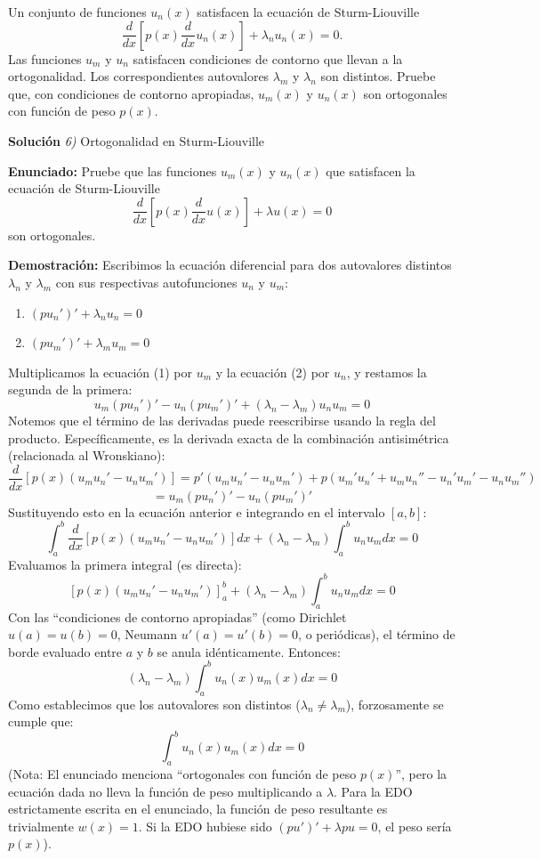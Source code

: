 \documentclass[11pt,spanish]{article}
\newcounter{problema}
\newcommand{\prob}{\stepcounter{problema} \vspace{.5cm} \noindent{\bf Problema \arabic{problema}: }}
\begin{document}
\prob Un conjunto de funciones $u_n(x)$ satisfacen la ecuación de Sturm-Liouville
\[
\frac{d}{dx}\left[p(x)\frac{d}{dx}u_n(x)\right] + \lambda_n u_n(x) = 0.
\]
Las funciones $u_m$ y $u_n$ satisfacen condiciones de contorno que llevan a la ortogonalidad. Los correspondientes autovalores $\lambda_m$ y $\lambda_n$ son distintos. Pruebe que, con condiciones de contorno apropiadas, $u_m(x)$ y $u_n(x)$ son ortogonales con función de peso $p(x)$.



\vspace{0.5cm}
{\bf Soluci\'on }{\em 6)}
Ortogonalidad en Sturm-Liouville
\vspace{0.5cm}

{\bf Enunciado:}
Pruebe que las funciones $u_m(x)$ y $u_n(x)$ que satisfacen la ecuación de Sturm-Liouville 
$$\frac{d}{dx}\left[p(x)\frac{d}{dx}u(x)\right] + \lambda u(x) = 0$$ 
son ortogonales.

{\bf Demostración:}
Escribimos la ecuación diferencial para dos autovalores distintos $\lambda_n$ y $\lambda_m$ con sus respectivas autofunciones $u_n$ y $u_m$:
\begin{enumerate}
\item $(p u_n')' + \lambda_n u_n = 0$
\item $(p u_m')' + \lambda_m u_m = 0$
\end{enumerate}
Multiplicamos la ecuación (1) por $u_m$ y la ecuación (2) por $u_n$, y restamos la segunda de la primera:
$$u_m(p u_n')' - u_n(p u_m')' + (\lambda_n - \lambda_m) u_n u_m = 0$$
Notemos que el término de las derivadas puede reescribirse usando la regla del producto. Específicamente, es la derivada exacta de la combinación antisimétrica (relacionada al Wronskiano):
$$\frac{d}{dx} \left[ p(x) (u_m u_n' - u_n u_m') \right] = p'(u_m u_n' - u_n u_m') + p(u_m' u_n' + u_m u_n'' - u_n' u_m' - u_n u_m'')$$
$$= u_m(p u_n')' - u_n(p u_m')'$$
Sustituyendo esto en la ecuación anterior e integrando en el intervalo $[a, b]$:
$$\int_a^b \frac{d}{dx} \left[ p(x) (u_m u_n' - u_n u_m') \right] dx + (\lambda_n - \lambda_m) \int_a^b u_n u_m dx = 0$$
Evaluamos la primera integral (es directa):
$$[ p(x) (u_m u_n' - u_n u_m') ]_a^b + (\lambda_n - \lambda_m) \int_a^b u_n u_m dx = 0$$
Con las ``condiciones de contorno apropiadas'' (como Dirichlet $u(a)=u(b)=0$, Neumann $u'(a)=u'(b)=0$, o periódicas), el término de borde evaluado entre $a$ y $b$ se anula idénticamente. Entonces:
$$(\lambda_n - \lambda_m) \int_a^b u_n(x) u_m(x) dx = 0$$
Como establecimos que los autovalores son distintos ($\lambda_n \neq \lambda_m$), forzosamente se cumple que:
$$\int_a^b u_n(x) u_m(x) dx = 0$$
(Nota: El enunciado menciona ``ortogonales con función de peso $p(x)$'', pero la ecuación dada no lleva la función de peso multiplicando a $\lambda$. Para la EDO estrictamente escrita en el enunciado, la función de peso resultante es trivialmente $w(x)=1$. Si la EDO hubiese sido $(pu')' + \lambda p u = 0$, el peso sería $p(x)$).
\end{document}
